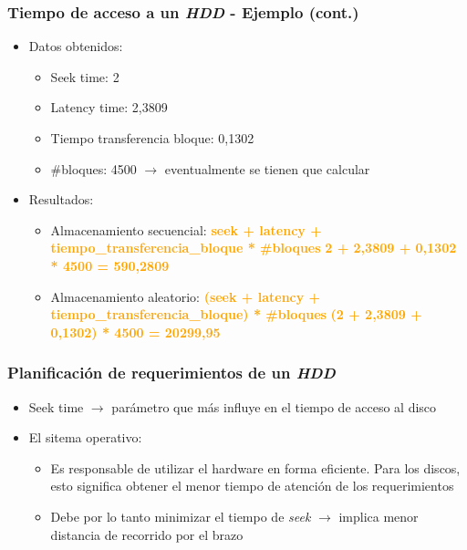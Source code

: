 \begin{frame}
  \frametitle{Tiempo de acceso a un \textit{HDD} - Ejemplo (cont.)}
  \begin{itemize}
    \item Datos obtenidos:
    \begin{itemize}
      \item Seek time: 2 \ms
      \item Latency time: 2,3809 \ms
      \item Tiempo transferencia bloque: 0,1302 \ms
      \item \#bloques: 4500 $\rightarrow$ eventualmente se tienen que calcular
    \end{itemize}
    \item Resultados:
    \begin{itemize}
      \item Almacenamiento secuencial:
      \linebreak
      \textcolor{orange}{\textbf{seek + latency + tiempo\_transferencia\_bloque * \#bloques}}
      \linebreak
      \textcolor{orange}{\textbf{2 + 2,3809 + 0,1302 * 4500 = 590,2809 \ms}}      
      \item Almacenamiento aleatorio:
      \linebreak
      \textcolor{orange}{\textbf{(seek + latency + tiempo\_transferencia\_bloque) * \#bloques}}        
      \linebreak
      \textcolor{orange}{\textbf{(2 + 2,3809 + 0,1302) * 4500 = 20299,95 \ms}}
      \linebreak
    \end{itemize}
  \end{itemize} 
\end{frame}

\begin{frame}
  \frametitle{Planificación de requerimientos de un \textit{HDD}}
  \begin{itemize}
    \item Seek time $\rightarrow$ parámetro que más influye en el tiempo de acceso al disco
    \item El sitema operativo:
    \begin{itemize}
      \item Es responsable de utilizar el hardware en forma eficiente. Para los discos, esto significa obtener el menor tiempo de atención de los requerimientos
      \item Debe por lo tanto minimizar el tiempo de \textit{seek} $\rightarrow$ implica menor distancia de recorrido por el brazo
    \end{itemize}
  \end{itemize}
\end{frame}

